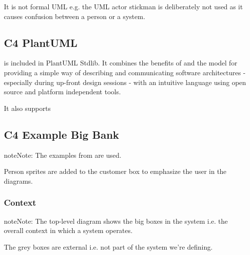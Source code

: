 \documentclass[letterpaper,10pt,english]{sphinxmanual}
\begin{document}
It is not formal UML e.g. the UML actor stickman is deliberately not
used as it causes confusion between a person or a system.


\subsection{C4 PlantUML}
\label{\detokenize{C4/C4Stdlib:c4-plantuml}}
 is included in PlantUML Stdlib. It combines
the benefits of  and the {\hyperref[\detokenize{C4/c4:c4-label}]{}} model for providing a simple way of describing
and communicating software architectures - especially during up-front design sessions - with an intuitive language using open source and platform independent tools.

It also supports 
\begin{quote}

\end{quote}


\subsection{C4 Example Big Bank}
\label{\detokenize{C4/C4Stdlib:c4-example-big-bank}}
\begin{sphinxadmonition}{note}{Note:}
The examples from  are used.

Person sprites are added to the customer box to emphasize the user in the diagrams.
\end{sphinxadmonition}


\subsubsection{Context}
\label{\detokenize{C4/C4Stdlib:context}}
\begin{sphinxadmonition}{note}{Note:}
The top-level diagram shows the big boxes in the system i.e. the overall context in which a system operates.

The grey boxes are external i.e. not part of the system we’re defining.
\end{sphinxadmonition}
\end{document}
